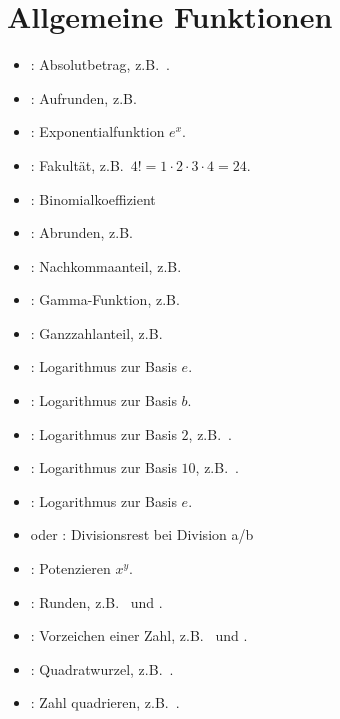 \chapter{Allgemeine Funktionen}

\begin{itemize}

\item
{}:
Absolutbetrag, z.B.\ .

\item
{}:
Aufrunden, z.B.\ 

\item
{}:
Exponentialfunktion $e^x$.

\item
{}:
Fakultät, z.B.\ $4!=1\cdot2\cdot3\cdot4=24$.

\item
{}:
Binomialkoeffizient

\item
{}:
Abrunden, z.B.\ 

\item
{}:
Nachkommaanteil, z.B.\ 

\item
{}:
Gamma-Funktion, z.B.\ 

\item
{}:
Ganzzahlanteil, z.B.\ 

\item
{}:
Logarithmus zur Basis $e$.

\item
{}:
Logarithmus zur Basis $b$.

\item
{}:
Logarithmus zur Basis $2$, z.B.\ .

\item
{}:
Logarithmus zur Basis $10$, z.B.\ .

\item
{}:
Logarithmus zur Basis $e$.

\item
{} oder :
Divisionsrest bei Division a/b

\item
{}:
Potenzieren $x^y$.

\item
{}:
Runden, z.B.\  und .

\item
{}:
Vorzeichen einer Zahl, z.B.\  und .

\item
{}:
Quadratwurzel, z.B.\ .

\item
{}:
Zahl quadrieren, z.B.\ .

\end{itemize}



